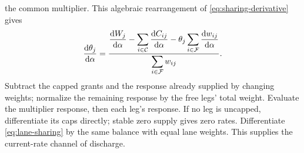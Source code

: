 \documentclass[10pt,a4paper]{article}
\begin{document}
the common multiplier.
This algebraic rearrangement of \eqref{eq:sharing-derivative} gives
\begin{equation}
 \frac{\mathrm d\theta_j}{\mathrm d\alpha}
 =\frac{\displaystyle
 \frac{\mathrm dW_j}{\mathrm d\alpha}
 -\sum_{i\in{\cal C}}\frac{\mathrm dC_{ij}}{\mathrm d\alpha}
 -\theta_j\sum_{i\in{\cal F}}\frac{\mathrm dw_{ij}}{\mathrm d\alpha}}
 {\displaystyle\sum_{i\in{\cal F}}w_{ij}}.
 \label{eq:sharing-level-derivative}
\end{equation}
Subtract the capped grants and the response already supplied by changing
weights; normalize the remaining response by the free legs' total weight.
Evaluate the multiplier response, then each leg's response. If no leg is
uncapped, differentiate its caps directly; stable zero supply gives zero
rates. Differentiate \eqref{eq:lane-sharing} by the same balance with
equal lane weights. This supplies the current-rate channel of discharge.
\end{document}
